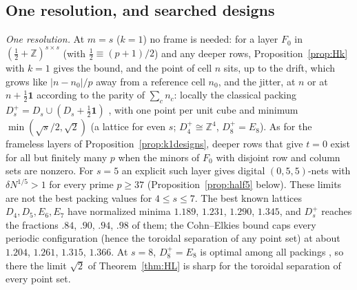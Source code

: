 \documentclass[11pt]{amsart}
\theoremstyle{definition}
\theoremstyle{plain}
\newcommand{\Z}{\mathbb{Z}}
\begin{document}
\subsection{One resolution, and searched designs}\label{sec:halfms}
\emph{One resolution.} At $m=s$ ($k=1$) no frame is needed: for a layer $F_0$ in $(\frac12+\Z)^{s\times s}$ (with $\frac12\equiv(p+1)/2$) and any deeper rows, Proposition~\ref{prop:Hk} with $k=1$ gives the bound, and the point of cell $n$ sits, up to the drift, which grows like $|n-n_0|/p$ away from a reference cell $n_0$, and the jitter, at $n$ or at $n+\frac12\mathbf 1$ according to the parity of $\sum_cn_c$: locally the classical packing $D_s^+=D_s\cup(D_s+\frac12\mathbf 1)$ \cite[Ch.~4]{CS99}, with one point per unit cube and minimum $\min(\sqrt s/2,\sqrt2)$ (a lattice for even $s$; $D_4^+\cong\Z^4$, $D_8^+=E_8$). As for the frameless layers of Proposition~\ref{prop:k1designs}, deeper rows that give $t=0$ exist for all but finitely many $p$ when the minors of $F_0$ with disjoint row and column sets are nonzero. For $s=5$ an explicit such layer gives digital $(0,5,5)$-nets with $\delta N^{1/5}>1$ for every prime $p\ge37$ (Proposition~\ref{prop:half5} below). These limits are not the best packing values for $4\le s\le7$. The best known lattices $D_4,D_5,E_6,E_7$ have normalized minima $1.189$, $1.231$, $1.290$, $1.345$, and $D_s^+$ reaches the fractions $.84$, $.90$, $.94$, $.98$ of them; the Cohn--Elkies bound \cite{CE03} caps every periodic configuration (hence the toroidal separation of any point set) at about $1.204$, $1.261$, $1.315$, $1.366$. At $s=8$, $D_8^+=E_8$ is optimal among all packings \cite{Via17}, so there the limit $\sqrt2$ of Theorem~\ref{thm:HL} is sharp for the toroidal separation of every point set.
\end{document}

